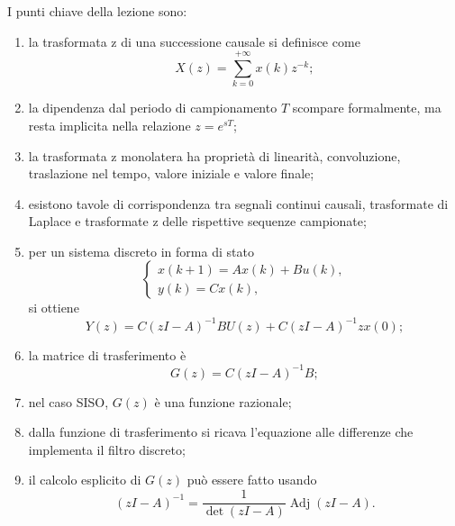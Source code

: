 I punti chiave della lezione sono:
\begin{enumerate}
    \item la trasformata z di una successione causale si definisce come
    \[
    X(z)=\sum_{k=0}^{+\infty}x(k)z^{-k};
    \]
    \item la dipendenza dal periodo di campionamento \(T\) scompare formalmente,
    ma resta implicita nella relazione \(z=e^{sT}\);
    \item la trasformata z monolatera ha propriet\`a di linearit\`a, convoluzione,
    traslazione nel tempo, valore iniziale e valore finale;
    \item esistono tavole di corrispondenza tra segnali continui causali,
    trasformate di Laplace e trasformate z delle rispettive sequenze campionate;
    \item per un sistema discreto in forma di stato
    \[
    \begin{cases}
    x(k+1)=Ax(k)+Bu(k),\\
    y(k)=Cx(k),
    \end{cases}
    \]
    si ottiene
    \[
    Y(z)=C(zI-A)^{-1}BU(z)+C(zI-A)^{-1}zx(0);
    \]
    \item la matrice di trasferimento \`e
    \[
    G(z)=C(zI-A)^{-1}B;
    \]
    \item nel caso SISO, \(G(z)\) \`e una funzione razionale;
    \item dalla funzione di trasferimento si ricava l'equazione alle differenze
    che implementa il filtro discreto;
    \item il calcolo esplicito di \(G(z)\) pu\`o essere fatto usando
    \[
    (zI-A)^{-1}=\frac{1}{\det(zI-A)}\operatorname{Adj}(zI-A).
    \]
\end{enumerate}